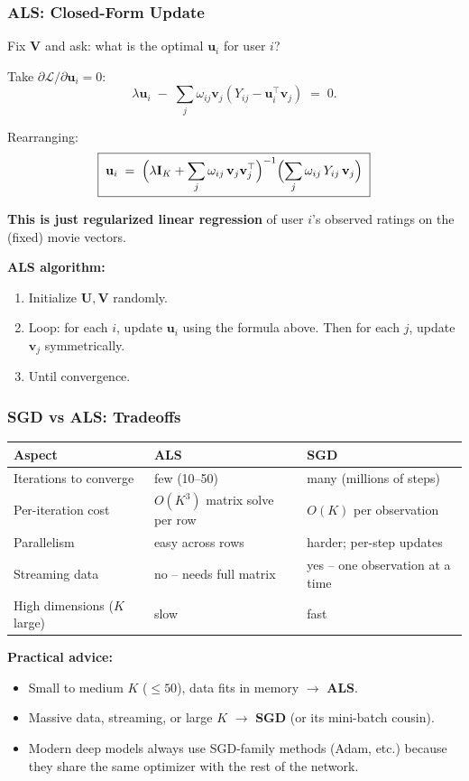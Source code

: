 \documentclass[notes,11pt, aspectratio=169]{beamer}
\newcommand{\vu}{\mathbf{u}}
\newcommand{\vv}{\mathbf{v}}
\newcommand{\vU}{\mathbf{U}}
\newcommand{\vV}{\mathbf{V}}
\begin{document}
\begin{frame}
\frametitle{ALS: Closed-Form Update}

Fix $\vV$ and ask: what is the optimal $\vu_i$ for user $i$?

\vspace{4pt}
Take $\partial \mathcal{L} / \partial \vu_i = 0$:
\[
    \lambda \vu_i \;-\; \sum_j \omega_{ij} \vv_j (Y_{ij} - \vu_i^\top \vv_j) \;=\; 0.
\]

\vspace{4pt}
Rearranging:
\[
    \boxed{\;\vu_i \;=\; \Bigl(\lambda \mathbf{I}_K + \sum_j \omega_{ij}\, \vv_j \vv_j^\top\Bigr)^{-1} \Bigl(\sum_j \omega_{ij}\, Y_{ij}\, \vv_j\Bigr)\;}
\]

\vspace{6pt}
\textbf{This is just regularized linear regression} of user $i$'s observed ratings on the (fixed) movie vectors.

\vspace{8pt}
\textbf{ALS algorithm:}
\begin{enumerate}
    \item Initialize $\vU, \vV$ randomly.
    \item Loop: for each $i$, update $\vu_i$ using the formula above. Then for each $j$, update $\vv_j$ symmetrically.
    \item Until convergence.
\end{enumerate}
\end{frame}

\begin{frame}
\frametitle{SGD vs ALS: Tradeoffs}

\renewcommand{\arraystretch}{1.3}
\begin{center}
{\small
\begin{tabular}{p{4cm} p{4.5cm} p{4.5cm}}
\toprule
\textbf{Aspect} & \textbf{ALS} & \textbf{SGD} \\
\midrule
Iterations to converge & few (10--50) & many (millions of steps) \\
Per-iteration cost & $O(K^3)$ matrix solve per row & $O(K)$ per observation \\
Parallelism & easy across rows & harder; per-step updates \\
Streaming data & no -- needs full matrix & yes -- one observation at a time \\
High dimensions ($K$ large) & slow & fast \\
\bottomrule
\end{tabular}
}
\end{center}

\vspace{8pt}
\textbf{Practical advice:}
\begin{itemize}
    \item Small to medium $K$ ($\leq 50$), data fits in memory $\to$ \textbf{ALS}.
    \item Massive data, streaming, or large $K$ $\to$ \textbf{SGD} (or its mini-batch cousin).
    \item Modern deep models always use SGD-family methods (Adam, etc.) because they share the same optimizer with the rest of the network.
\end{itemize}
\end{frame}
\end{document}
